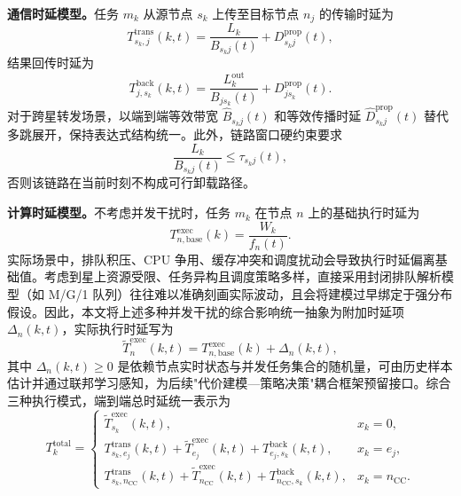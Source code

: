 \textbf{通信时延模型。}任务 $m_k$ 从源节点 $s_k$ 上传至目标节点 $n_j$ 的传输时延为
\begin{equation}
  T_{s_k,j}^{\mathrm{trans}}(k,t)=\frac{L_k}{B_{s_kj}(t)}+D_{s_kj}^{\mathrm{prop}}(t),
\end{equation}
结果回传时延为
\begin{equation}
  T_{j,s_k}^{\mathrm{back}}(k,t)=\frac{L_k^{\mathrm{out}}}{B_{js_k}(t)}+D_{js_k}^{\mathrm{prop}}(t).
\end{equation}
对于跨星转发场景，以端到端等效带宽 $\hat{B}_{s_kj}(t)$ 和等效传播时延 $\hat{D}_{s_kj}^{\mathrm{prop}}(t)$ 替代多跳展开，保持表达式结构统一。此外，链路窗口硬约束要求
\begin{equation}
  \frac{L_k}{B_{s_kj}(t)} \leq \tau_{s_kj}(t),
\end{equation}
否则该链路在当前时刻不构成可行卸载路径。

\textbf{计算时延模型。}不考虑并发干扰时，任务 $m_k$ 在节点 $n$ 上的基础执行时延为
\begin{equation}
  T_{n,\mathrm{base}}^{\mathrm{exec}}(k)=\frac{W_k}{f_n(t)}.
\end{equation}
实际场景中，排队积压、CPU 争用、缓存冲突和调度扰动会导致执行时延偏离基础值。考虑到星上资源受限、任务异构且调度策略多样，直接采用封闭排队解析模型（如 M/G/1 队列）往往难以准确刻画实际波动，且会将建模过早绑定于强分布假设。因此，本文将上述多种并发干扰的综合影响统一抽象为附加时延项 $\Delta_n(k,t)$，实际执行时延写为
\begin{equation}
  \tilde{T}_n^{\mathrm{exec}}(k,t)=T_{n,\mathrm{base}}^{\mathrm{exec}}(k)+\Delta_n(k,t),
\end{equation}
其中 $\Delta_n(k,t)\geq 0$ 是依赖节点实时状态与并发任务集合的随机量，可由历史样本估计并通过联邦学习感知，为后续"代价建模—策略决策"耦合框架预留接口\cite{Li2024MARLComCom,Xiu2025MARATD3}。综合三种执行模式，端到端总时延统一表示为
\begin{equation}
  T_k^{\mathrm{total}}=
  \begin{cases}
    \tilde{T}_{s_k}^{\mathrm{exec}}(k,t), & x_k=0, \\[4pt]
    T_{s_k,e_j}^{\mathrm{trans}}(k,t)+\tilde{T}_{e_j}^{\mathrm{exec}}(k,t)+T_{e_j,s_k}^{\mathrm{back}}(k,t), & x_k=e_j, \\[4pt]
    T_{s_k,n_{\mathrm{CC}}}^{\mathrm{trans}}(k,t)+\tilde{T}_{n_{\mathrm{CC}}}^{\mathrm{exec}}(k,t)+T_{n_{\mathrm{CC}},s_k}^{\mathrm{back}}(k,t), & x_k=n_{\mathrm{CC}}.
  \end{cases}
\end{equation}

